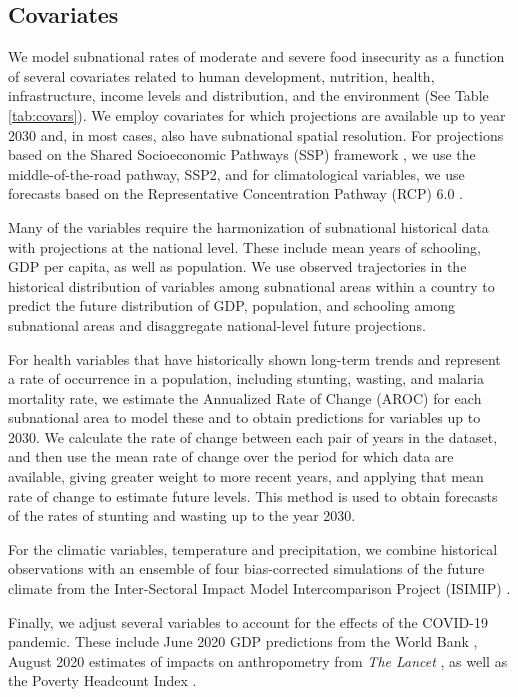 \documentclass{article}
\begin{document}
\subsection{Covariates}
We model subnational rates of moderate and severe food insecurity as a function of several covariates related to human development, nutrition, health, infrastructure, income levels and distribution, and the environment (See Table \ref{tab:covars}).  We employ covariates for which projections are available up to year 2030 and, in most cases, also have subnational spatial resolution.  For projections based on the Shared Socioeconomic Pathways (SSP) framework \citep{oneill2014new}, we use the middle-of-the-road pathway, SSP2, and for climatological variables, we use forecasts based on the Representative Concentration Pathway (RCP) 6.0 \citep{van2011representative}.  

Many of the variables require the harmonization of subnational historical data with projections at the national level.  These include mean years of schooling, GDP per capita, as well as population. We use observed trajectories in the historical distribution of variables among subnational areas within a country to predict the future distribution of GDP, population, and schooling among subnational areas and disaggregate national-level future projections.

For health variables that have historically shown long-term trends and represent a rate of occurrence in a population, including stunting, wasting, and malaria mortality rate, we estimate the Annualized Rate of Change (AROC) for each subnational area to model these and to obtain predictions for variables up to 2030. We calculate the rate of change between each pair of years in the dataset, and then use the mean rate of change over the period for which data are available, giving greater weight to more recent years, and applying that mean rate of change to estimate future levels.  This method is used to obtain forecasts of the rates of stunting and wasting up to the year 2030.

For the climatic variables, temperature and precipitation, we combine historical observations with an ensemble of four bias-corrected simulations of the future climate from the Inter-Sectoral Impact Model Intercomparison Project (ISIMIP) \citep{warszawski2014inter}.

Finally, we adjust several variables to account for the effects of the COVID-19 pandemic.  These include June 2020 GDP predictions from the World Bank \citep{prospects2020}, August 2020 estimates of impacts on anthropometry from \textit{The Lancet} \citep{headey2020impacts}, as well as the Poverty Headcount Index \cite{Cuaresma2018}.
\end{document}
